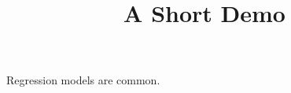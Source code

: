 \documentclass[article]{jss}
\title{A Short Demo}
\begin{document}
Regression models \citep{Cameron+Trivedi:2013} are common.
\end{document}

